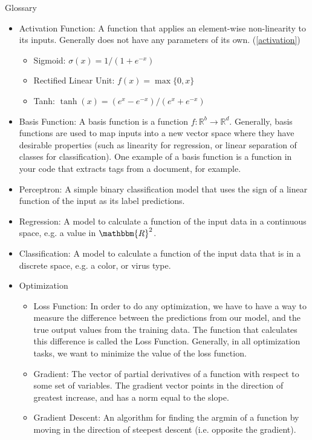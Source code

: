 \documentclass[12pt,letterpaper]{article}
\newcommand{\R}{\mathbbm{R}}
\newcommand{\1}{\mathbbm{1}}
\begin{document}
\begin{center}
\huge{Glossary}
\end{center}


\begin{itemize}
    \item Activation Function: A function that applies an element-wise non-linearity to its inputs. Generally does not have any parameters of its own. (\ref{activation})
    \begin{itemize}
        \item Sigmoid: $\sigma(x) = 1/(1 + e^{-x})$
        \item Rectified Linear Unit: $f(x) = \max\{0, x\}$
        \item Tanh: $\tanh(x) = (e^x - e^{-x})/(e^x + e^{-x})$
    \end{itemize}
    \item Basis Function: A basis function is a function $f: \mathbb{R}^{b} \to \mathbb{R}^d$. Generally, basis functions are used to map inputs into a new vector space where they have desirable properties (such as linearity for regression, or linear separation of classes for classification). One example of a basis function is a function in your code that extracts tags from a document, for example.
    \item Perceptron: A simple binary classification model that uses the sign of a linear function of the input as its label predictions.
    \item Regression: A model to calculate a function of the input data in a continuous space, e.g. a value in $\R^2$.
    \item Classification: A model to calculate a function of the input data that is in a discrete space, e.g. a color, or virus type.
    \item Optimization
    \begin{itemize}
    \item Loss Function: In order to do any optimization, we have to have a way to measure the difference between the predictions from our model, and the true output values from the training data. The function that calculates this difference is called the Loss Function. Generally, in all optimization tasks, we want to minimize the value of the loss function.
    \item Gradient: The vector of partial derivatives of a function with respect to some set of variables. The gradient vector points in the direction of greatest increase, and has a norm equal to the slope. 
    \item Gradient Descent: An algorithm for finding the argmin of a function by moving in the direction of steepest descent (i.e. opposite the gradient).

\end{itemize}
\end{itemize}
\end{document}
